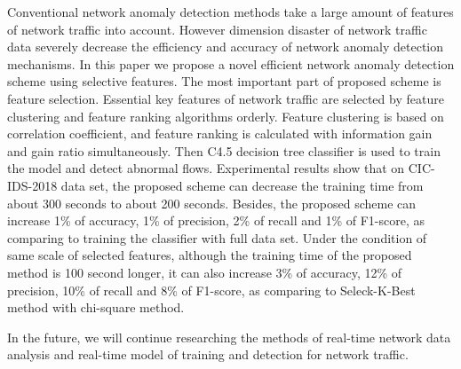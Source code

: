 \documentclass{ieeeaccess}
\theoremstyle{definition}
\begin{document}
Conventional network anomaly detection methods take a large amount of features of network traffic into account. 
However dimension disaster of network traffic data severely decrease the efficiency and accuracy of network anomaly detection mechanisms. In this paper we propose a novel efficient network anomaly detection scheme using selective features. 
The most important part of proposed scheme is feature selection. 
Essential key features of network traffic are selected by feature clustering and feature ranking algorithms orderly. Feature clustering is based on correlation coefficient, and feature ranking is calculated with information gain and gain ratio simultaneously.
Then C4.5 decision tree classifier is used to train the model and detect abnormal flows. 
Experimental results show that on CIC-IDS-2018 data set, the proposed scheme can decrease the training time from about 300 seconds to about 200 seconds. Besides, the proposed scheme can increase 1\% of accuracy, 1\% of precision, 2\% of recall and 1\% of F1-score, as comparing to training the classifier with full data set. 
Under the condition of same scale of selected features, although the training time of the proposed method is 100 second longer, it can also increase 3\% of accuracy, 12\% of precision, 10\% of recall and 8\% of F1-score, as comparing to Seleck-K-Best method with chi-square method.

In the future, we will continue researching the methods of real-time network data analysis and real-time model of training and detection for network traffic.
\end{document}
